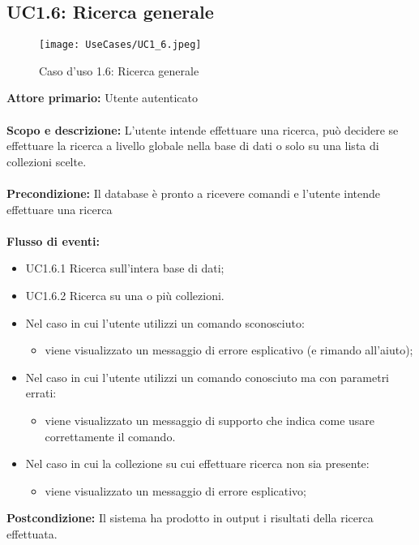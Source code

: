 \documentclass{scalatekids-article}
\begin{document}
\subsection{UC1.6: Ricerca generale}
\begin{figure}[H]
  \begin{center}
    \texttt{[image: UseCases/UC1\_6.jpeg]}
    \caption{Caso d'uso 1.6: Ricerca generale}
  \end{center}
\end{figure}
\textbf{Attore primario:} Utente autenticato \\ \\
\textbf{Scopo e descrizione:} L’utente intende effettuare una ricerca, può decidere se effettuare la ricerca a livello globale nella base di dati o solo su una lista di collezioni scelte.\\ \\
\textbf{Precondizione:} Il database è pronto a ricevere comandi e l’utente intende effettuare una ricerca\\ \\
\textbf{Flusso di eventi:}
\begin{itemize}
\item UC1.6.1 Ricerca sull'intera base di dati;
\item UC1.6.2 Ricerca su una o più collezioni.
\end{itemize}
\begin{itemize}
\item Nel caso in cui l'utente utilizzi un comando sconosciuto:
  \begin{itemize}
  \item viene visualizzato un messaggio di errore esplicativo (e rimando all'aiuto);
  \end{itemize}
\item Nel caso in cui l'utente utilizzi un comando conosciuto ma con parametri errati:
  \begin{itemize}
  \item viene visualizzato un messaggio di supporto che indica come usare correttamente il comando.
  \end{itemize}
\item Nel caso in cui la collezione su cui effettuare ricerca non sia presente:
  \begin{itemize}
  \item viene visualizzato un messaggio di errore esplicativo;
  \end{itemize}
\end{itemize}
\textbf{Postcondizione:} Il sistema ha prodotto in output i risultati della ricerca effettuata.
\end{document}
